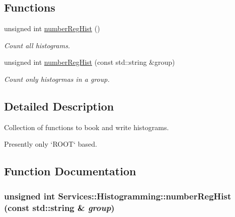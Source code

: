 \subsection*{Functions}
\begin{CompactItemize}
\item 
\hypertarget{namespaceServices_1_1Histogramming_f24556ae612cc9283720d9e964265bd5}{
unsigned int \hyperlink{namespaceServices_1_1Histogramming_f24556ae612cc9283720d9e964265bd5}{number\-Reg\-Hist} ()}
\label{namespaceServices_1_1Histogramming_f24556ae612cc9283720d9e964265bd5}

\begin{CompactList}\small\item\em Count all histograms. \item\end{CompactList}\item 
unsigned int \hyperlink{namespaceServices_1_1Histogramming_4731840672ebd592faf176c87a187c72}{number\-Reg\-Hist} (const std::string \&group)
\begin{CompactList}\small\item\em Count only histogrmas in a group. \item\end{CompactList}\end{CompactItemize}


\subsection{Detailed Description}
Collection of functions to book and write histograms. 

Presently only `ROOT` based. 



\subsection{Function Documentation}
\hypertarget{namespaceServices_1_1Histogramming_4731840672ebd592faf176c87a187c72}{
\subsubsection[numberRegHist]{\setlength{\rightskip}{0pt plus 5cm}unsigned int Services::Histogramming::number\-Reg\-Hist (const std::string \& {\em group})}}
\label{namespaceServices_1_1Histogramming_4731840672ebd592faf176c87a187c72}


